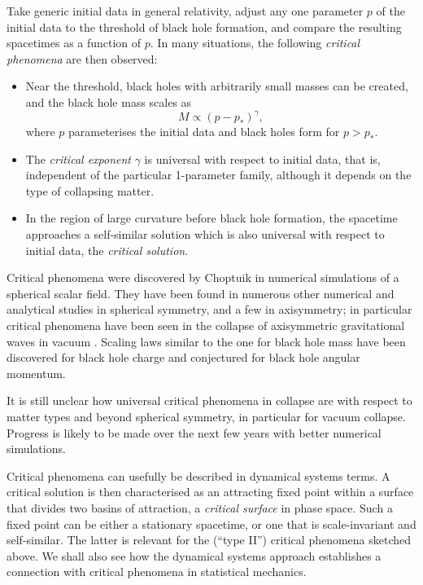 \documentclass{article}
\begin{document}
Take generic initial data in general relativity, adjust
any one parameter $p$ of the initial data to the threshold of black
hole formation, and compare the resulting spacetimes as a function of
$p$. In many situations, the following {\em critical phenomena} are
then observed:
\begin{itemize}

\item Near the threshold, black holes with arbitrarily small masses can be
created, and the black hole mass scales as 
\begin{equation}
\label{eq1}
M\propto (p-p_*)^\gamma,
\end{equation}
where $p$ parameterises the initial data and black holes form for
$p>p_*$. 

\item The {\em critical exponent} $\gamma$ is universal with respect to
initial data, that is, independent of the particular 1-parameter
family, although it depends on the type of collapsing matter.

\item In the region of large curvature before black hole formation,
the spacetime approaches a self-similar solution which is also
universal with respect to initial data, the {\em critical solution}. 

\end{itemize}

Critical phenomena were discovered by Choptuik 
\cite{Choptuik92} in numerical simulations of a spherical scalar
field. They have been found in numerous other numerical and
analytical studies in spherical symmetry, and a few in axisymmetry; in
particular critical phenomena have been seen in the collapse of
axisymmetric gravitational waves in vacuum \cite{AbrahamsEvans}. 
Scaling laws similar to the one for black hole mass 
have been discovered for black hole charge and
conjectured for black hole angular momentum.

It is still unclear how universal critical phenomena in collapse are
with respect to matter types and beyond spherical symmetry, in
particular for vacuum collapse. Progress is likely to be made over the
next few years with better numerical simulations.

Critical phenomena can usefully be described in dynamical systems
terms. A critical solution is then characterised as an attracting
fixed point within a surface that divides two basins of attraction, a
{\em critical surface} in phase space. Such a fixed point can be
either a stationary spacetime, or one that is scale-invariant and
self-similar. The latter is relevant for the (``type II'') critical
phenomena sketched above. We shall also see how the dynamical systems
approach establishes a connection with critical phenomena in
statistical mechanics.
\end{document}

